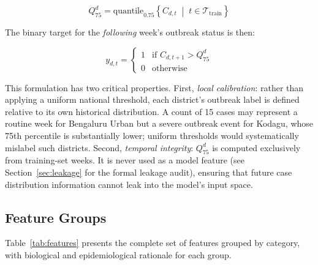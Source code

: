 \documentclass[conference]{IEEEtran}
\begin{document}
\begin{equation}
  Q_{75}^{d} = \text{quantile}_{0.75}
  \left\{ C_{d,t} \;\middle|\; t \in \mathcal{T}_{\text{train}} \right\}
  \label{eq:q75}
\end{equation}

The binary target for the \emph{following} week's outbreak status is
then:

\begin{equation}
  y_{d,t} = \begin{cases}
    1 & \text{if } C_{d,t+1} > Q_{75}^{d} \\
    0 & \text{otherwise}
  \end{cases}
  \label{eq:target}
\end{equation}

This formulation has two critical properties. First, \emph{local
calibration}: rather than applying a uniform national threshold,
each district's outbreak label is defined relative to its own
historical distribution. A count of 15 cases may represent a
routine week for Bengaluru Urban but a severe outbreak event for
Kodagu, whose 75th percentile is substantially lower; uniform
thresholds would systematically mislabel such districts. Second,
\emph{temporal integrity}: $Q_{75}^{d}$ is computed exclusively
from training-set weeks. It is never used as a model feature
(see Section~\ref{sec:leakage} for the formal leakage audit),
ensuring that future case distribution information cannot leak
into the model's input space.

\subsection{Feature Groups}
\label{subsec:features}

Table~\ref{tab:features} presents the complete set of features
grouped by category, with biological and epidemiological rationale
for each group.
\end{document}
